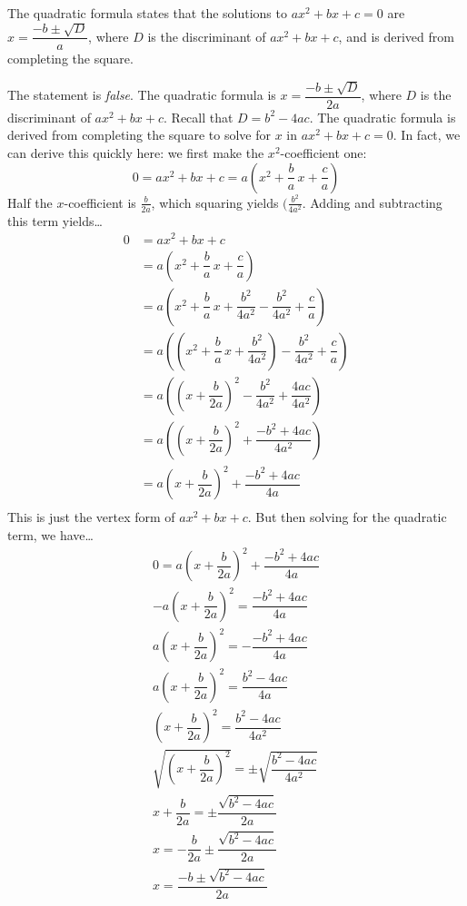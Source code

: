 \documentclass[11pt,letterpaper]{article}
\begin{document}
 The quadratic formula states that the solutions to $ax^2 + bx + c= 0$ are $x= \dfrac{-b \pm \sqrt{D}}{a}$, where $D$ is the discriminant of $ax^2 + bx + c$, and is derived from completing the square. \pspace

\sol The statement is \textit{false}. The quadratic formula is $x= \dfrac{-b \pm \sqrt{D}}{2a}$, where $D$ is the discriminant of $ax^2 + bx + c$. Recall that $D= b^2 - 4ac$. The quadratic formula is derived from completing the square to solve for $x$ in $ax^2 + bx + c= 0$. In fact, we can derive this quickly here: we first make the $x^2$-coefficient one:
	\[
	0= ax^2 + bx + c= a \left(x^2 + \dfrac{b}{a}\,x + \dfrac{c}{a} \right)
	\]
Half the $x$-coefficient is $\frac{b}{2a}$, which squaring yields $(\frac{b^2}{4a^2}$. Adding and subtracting this term yields\dots
	\[
	\begin{aligned}
	0&= ax^2 + bx + c \\
	&= a \left(x^2 + \dfrac{b}{a}\,x + \dfrac{c}{a} \right) \\
	&= a \left(x^2 + \dfrac{b}{a}\,x + \dfrac{b^2}{4a^2} - \dfrac{b^2}{4a^2} + \dfrac{c}{a} \right) \\
	&= a \left( \left(x^2 + \dfrac{b}{a}\,x + \dfrac{b^2}{4a^2} \right) - \dfrac{b^2}{4a^2} + \dfrac{c}{a} \right) \\
	&= a \left( \left(x + \dfrac{b}{2a} \right)^2 - \dfrac{b^2}{4a^2} + \dfrac{4ac}{4a^2} \right) \\
	&= a \left( \left(x + \dfrac{b}{2a} \right)^2 + \dfrac{-b^2 + 4ac}{4a^2} \right) \\
	&= a \left(x + \dfrac{b}{2a} \right)^2 + \dfrac{-b^2 + 4ac}{4a} \\
	\end{aligned}
	\]
This is just the vertex form of $ax^2 + bx + c$. But then solving for the quadratic term, we have\dots
	\[
	\begin{gathered}
	0= a \left(x + \dfrac{b}{2a} \right)^2 + \dfrac{-b^2 + 4ac}{4a} \\
	-a \left(x + \dfrac{b}{2a} \right)^2= \dfrac{-b^2 + 4ac}{4a} \\
	a \left(x + \dfrac{b}{2a} \right)^2= -\dfrac{-b^2 + 4ac}{4a} \\
	a \left(x + \dfrac{b}{2a} \right)^2= \dfrac{b^2 - 4ac}{4a} \\
	\left(x + \dfrac{b}{2a} \right)^2= \dfrac{b^2 - 4ac}{4a^2} \\
	\sqrt{\left(x + \dfrac{b}{2a} \right)^2}= \pm \sqrt{\dfrac{b^2 - 4ac}{4a^2}} \\
	x + \dfrac{b}{2a}= \pm \dfrac{\sqrt{b^2 - 4ac}}{2a} \\
	x= -\dfrac{b}{2a} \pm \dfrac{\sqrt{b^2 - 4ac}}{2a} \\
	x= \dfrac{-b \pm \sqrt{b^2 - 4ac}}{2a} \\
	\end{gathered}
	\]
\end{document}
